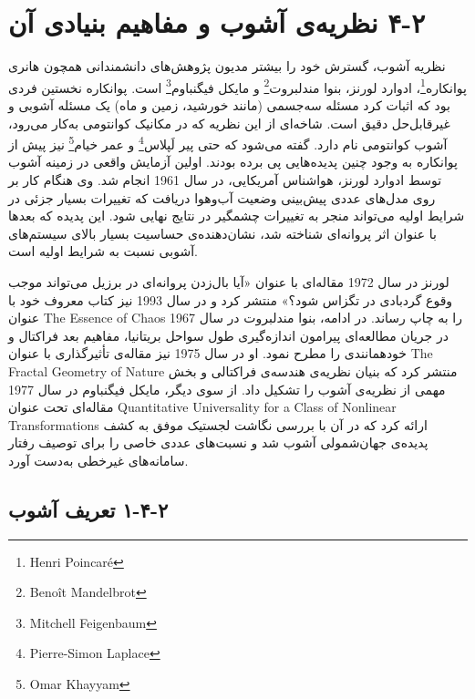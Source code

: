 \section{‏۲‏-‏۴‏ نظریه‌ی آشوب و مفاهیم بنیادی آن}

نظریه آشوب، گسترش خود را بیشتر مدیون پژوهش‌های دانشمندانی همچون هانری پوانکاره\footnote{Henri Poincaré}، ادوارد لورنز، بنوا مندلبروت\footnote{Benoît Mandelbrot} و مایکل فیگنباوم\footnote{Mitchell Feigenbaum} است. پوانکاره نخستین فردی بود که اثبات کرد مسئله سه‌جسمی (مانند خورشید، زمین و ماه) یک مسئله آشوبی و غیرقابل‌حل دقیق است. شاخه‌ای از این نظریه که در مکانیک کوانتومی به‌کار می‌رود، آشوب کوانتومی نام دارد. گفته می‌شود که حتی پیر لَپلاس\footnote{Pierre-Simon Laplace} و عمر خیام\footnote{Omar Khayyam} نیز پیش از پوانکاره به وجود چنین پدیده‌هایی پی برده بودند. اولین آزمایش واقعی در زمینه آشوب توسط ادوارد لورنز، هواشناس آمریکایی، در سال 1961 انجام شد. وی هنگام کار بر روی مدل‌های عددی پیش‌بینی وضعیت آب‌وهوا دریافت که تغییرات بسیار جزئی در شرایط اولیه می‌تواند منجر به تغییرات چشمگیر در نتایج نهایی شود. این پدیده که بعدها با عنوان اثر پروانه‌ای شناخته شد، نشان‌دهنده‌ی حساسیت بسیار بالای سیستم‌های آشوبی نسبت به شرایط اولیه است\cite{ref46}.

لورنز در سال 1972 مقاله‌ای با عنوان «آیا بال‌زدن پروانه‌ای در برزیل می‌تواند موجب وقوع گردبادی در تگزاس شود؟» منتشر کرد و در سال 1993 نیز کتاب معروف خود با عنوان The Essence of Chaos را به چاپ رساند. در ادامه، بنوا مندلبروت در سال 1967 در جریان مطالعه‌ای پیرامون اندازه‌گیری طول سواحل بریتانیا، مفاهیم بعد فراکتال و خودهمانندی  را مطرح نمود. او در سال 1975 نیز مقاله‌ی تأثیرگذاری با عنوان The Fractal Geometry of Nature منتشر کرد که بنیان نظریه‌ی هندسه‌ی فراکتالی و بخش مهمی از نظریه‌ی آشوب را تشکیل داد. از سوی دیگر، مایکل فیگنباوم در سال 1977 مقاله‌ای تحت عنوان Quantitative Universality for a Class of Nonlinear Transformations ارائه کرد که در آن با بررسی نگاشت لجستیک موفق به کشف پدیده‌ی جهان‌شمولی آشوب شد و نسبت‌های عددی خاصی را برای توصیف رفتار سامانه‌های غیرخطی به‌دست آورد\cite{ref45}.

\subsection{‏۲‏-‏۴‏-‏۱‏ تعریف آشوب}

